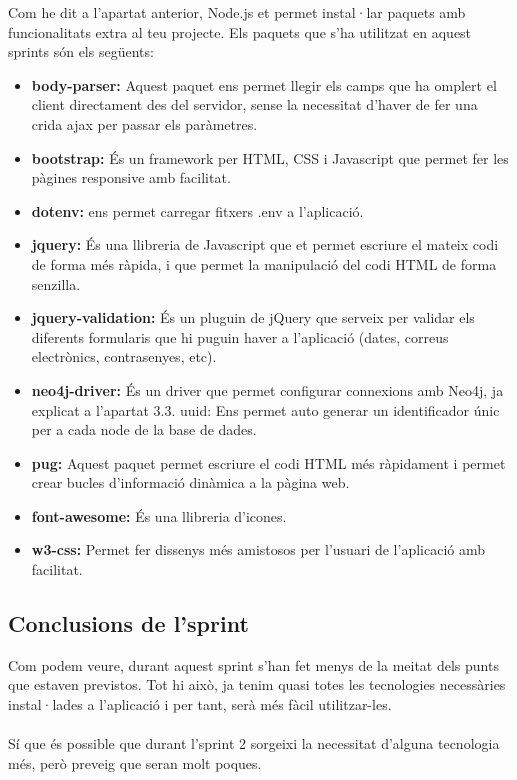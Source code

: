 \documentclass[11pt,catalan,listoffigures,listoftables]{tfgetsinf}
\begin{document}
Com he dit a l'apartat anterior, Node.js et permet instal·lar paquets amb funcionalitats extra al teu projecte. Els paquets que s'ha utilitzat en aquest sprints són els següents:
\begin{itemize}
\item \textbf{body-parser:} Aquest paquet ens permet llegir els camps que ha omplert el client directament des del servidor, sense la necessitat d'haver de fer una crida ajax per passar els paràmetres.
\item \textbf{bootstrap:} És un framework per HTML, CSS i Javascript que permet fer les pàgines responsive amb facilitat.
\item \textbf{dotenv:} ens permet carregar fitxers .env a l'aplicació.
\item \textbf{jquery:} És una llibreria de Javascript que et permet escriure el mateix codi de forma més ràpida, i que permet la manipulació del codi HTML de forma senzilla.
\item \textbf{jquery-validation:} És un pluguin de jQuery que serveix per validar els diferents formularis que hi puguin haver a l'aplicació (dates, correus electrònics, contrasenyes, etc).
\item \textbf{neo4j-driver:} És un driver que permet configurar connexions amb Neo4j, ja explicat a l'apartat 3.3.
uuid: Ens permet auto generar un identificador únic per a cada node de la base de dades.
\item \textbf{pug:} Aquest paquet permet escriure el codi HTML més ràpidament i permet crear bucles d'informació dinàmica a la pàgina web.
\item \textbf{font-awesome:} És una llibreria d'icones.
\item \textbf{w3-css:} Permet fer dissenys més amistosos per l'usuari de l'aplicació amb facilitat.

\end{itemize}

\subsection{Conclusions de l'sprint}

Com podem veure, durant aquest sprint s'han fet menys de la meitat dels punts que estaven previstos. Tot hi això, ja tenim quasi totes les tecnologies necessàries instal·lades a l'aplicació i per tant, serà més fàcil utilitzar-les.\\ \\
Sí que és possible que durant l'sprint 2 sorgeixi la necessitat d'alguna tecnologia més, però preveig que seran molt poques.
\end{document}
